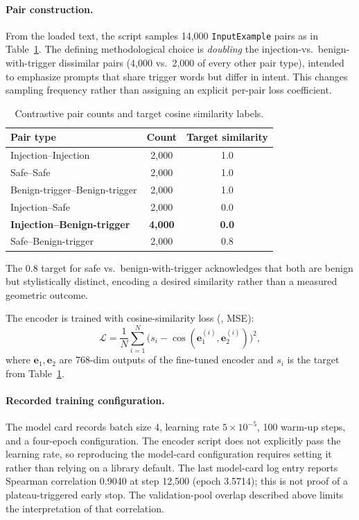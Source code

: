 \documentclass[11pt, a4paper]{article}
\begin{document}
\paragraph{Pair construction.} From the loaded text, the script samples
14{,}000 \texttt{InputExample} pairs as in Table~\ref{tab:pairs}. The
defining methodological choice is \emph{doubling} the injection-vs.\
benign-with-trigger dissimilar pairs (4{,}000 vs.\ 2{,}000 of every other
pair type), intended to emphasize prompts that share trigger words but differ in intent.
This changes sampling frequency rather than assigning an explicit per-pair
loss coefficient.

\begin{table}[H]
\centering
\small
\caption{Contrastive pair counts and target cosine similarity labels.}
\label{tab:pairs}
\begin{tabular}{lcc}
\toprule
\textbf{Pair type} & \textbf{Count} & \textbf{Target similarity} \\
\midrule
Injection--Injection                       & 2{,}000 & 1.0 \\
Safe--Safe                                 & 2{,}000 & 1.0 \\
Benign-trigger--Benign-trigger             & 2{,}000 & 1.0 \\
Injection--Safe                            & 2{,}000 & 0.0 \\
\textbf{Injection--Benign-trigger}         & \textbf{4{,}000} & \textbf{0.0} \\
Safe--Benign-trigger                       & 2{,}000 & 0.8 \\
\bottomrule
\end{tabular}
\end{table}

The 0.8 target for safe vs.\ benign-with-trigger acknowledges that both
are benign but stylistically distinct, encoding a desired similarity rather than a measured geometric outcome.

The encoder is trained with cosine-similarity loss
(, MSE):
\begin{equation}
\mathcal{L} = \frac{1}{N} \sum_{i=1}^{N}
\bigl(s_i - \cos(\mathbf{e}_1^{(i)}, \mathbf{e}_2^{(i)})\bigr)^2,
\end{equation}
where $\mathbf{e}_1, \mathbf{e}_2$ are 768-dim outputs of the fine-tuned
encoder and $s_i$ is the target from Table~\ref{tab:pairs}.

\paragraph{Recorded training configuration.}
The model card records batch size 4, learning rate $5\times10^{-5}$,
100 warm-up steps, and a four-epoch configuration. The encoder script does
not explicitly pass the learning rate, so reproducing the model-card
configuration requires setting it rather than relying on a library default.
The last model-card log entry reports Spearman correlation 0.9040 at step
12{,}500 (epoch 3.5714); this is not proof of a plateau-triggered early stop.
The validation-pool overlap described above limits the interpretation of
that correlation.
\end{document}
